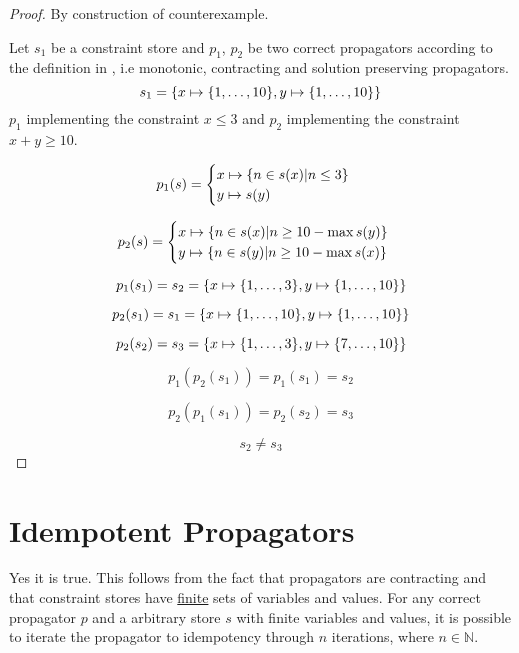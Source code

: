 \documentclass[a4paper, 11pt]{article}
\newcommand\mymapsto{\mathrel{\ooalign{$\rightarrow$\cr%
      \kern-.15ex\raise.275ex\hbox{\scalebox{1}[0.522]{$\mid$}}\cr}}}
\begin{document}
\begin{proof}
By construction of counterexample.

  Let $s_1$ be a constraint store and $p_1$, $p_2$ be two correct propagators according to the definition in \citep{schulte_notes}, i.e monotonic, contracting and solution preserving propagators.
  $$s_1 = \{x \mymapsto \{1, \ldots, 10\}, y \mymapsto \{1, \ldots, 10\} \}$$
  $p_1$ implementing the constraint $x \leq 3$ and $p_2$ implementing the constraint $x+y \geq 10$.

\begin{gather*}
p_{1}(s) = 
\begin{cases}
  x \mymapsto \{n \in s(x) | n \leq 3 \}\\
  y \mymapsto s(y)\\
\end{cases}
\end{gather*}

\begin{gather*}
p_{2}(s) = 
\begin{cases}
  x \mymapsto \{n \in s(x) | n \geq 10 - \max s(y) \}\\
  y \mymapsto \{n \in s(y) | n \geq 10 - \max s(x) \}\\
\end{cases}
\end{gather*}

$$p_1(s_1) = s_2 = \{x \mymapsto \{1, \ldots, 3\}, y \mymapsto \{1, \ldots, 10\} \}$$

$$p_2(s_1) = s_1 = \{x \mymapsto \{1, \ldots, 10\}, y \mymapsto \{1, \ldots, 10\} \}$$

$$p_2(s_2) = s_3 = \{x \mymapsto \{1, \ldots, 3\}, y \mymapsto \{7, \ldots, 10\} \}$$

$$p_1(p_2(s_1)) = p_1(s_1) = s_2$$

$$p_2(p_1(s_1)) = p_2(s_2) = s_3$$

$$s_2 \neq s_3$$
\end{proof}

\section*{Idempotent Propagators}
Yes it is true. This follows from the fact that propagators are contracting and that constraint stores have \underline{finite} sets of variables and values. For any correct propagator $p$ and a arbitrary store $s$ with finite variables and values, it is possible to iterate the propagator to idempotency through $n$ iterations, where $n \in \mathbb{N}$.
\end{document}

